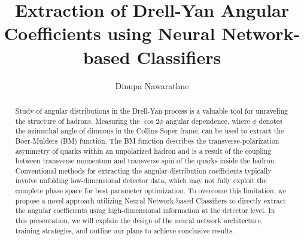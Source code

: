 \documentclass{article}
\title{Extraction of Drell-Yan Angular Coefficients using Neural Network-based Classifiers}
\author{Dinupa Nawarathne}
\begin{document}
\maketitle


%
%

\begin{abstract}
Study of angular distributions in the Drell-Yan process is a valuable tool for unraveling the structure of hadrons.
Measuring the $\cos2\phi$ angular dependence, where $\phi$ denotes the azimuthal angle of dimuons in the Collins-Soper
frame, can be used to extract the Boer-Mulders (BM) function. The BM function describes the transverse-polarization
asymmetry of quarks within an unpolarized hadron and is a result of the coupling between transverse momentum and
transverse spin of the quarks inside the hadron. Conventional methods for extracting the angular-distribution coefficients
typically involve unfolding low-dimensional detector data, which may not fully exploit the complete phase space for
best parameter optimization. To overcome this limitation, we propose a novel approach utilizing Neural Network-based
Classifiers to directly extract the angular coefficients using high-dimensional information at the detector level.
In this presentation, we will explain the design of the neural network architecture, training strategies, and outline
our plans to achieve conclusive results.
\end{abstract}
\end{document}
